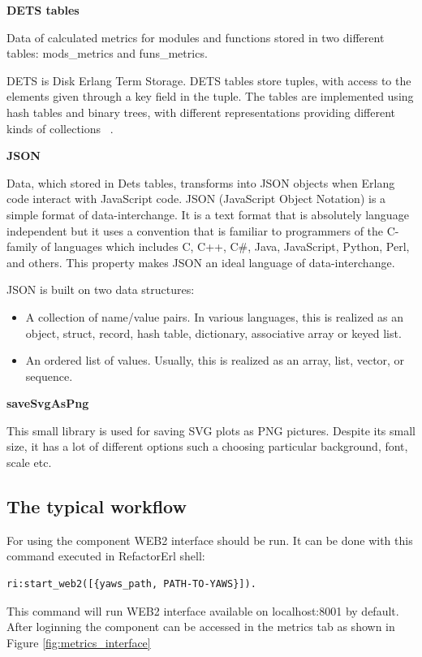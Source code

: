 \textbf{DETS tables}

Data of calculated metrics for modules and functions stored in two different tables: mods\_metrics and funs\_metrics.

DETS is Disk Erlang Term Storage. DETS tables store tuples, with access to the elements given through a  key field in the tuple. The tables are implemented using hash tables and binary trees, with different representations providing different kinds of collections ~\cite{erland_o'reilly}.

\textbf{JSON}

Data, which stored in Dets tables, transforms into JSON objects when Erlang code interact with JavaScript code. JSON (JavaScript Object Notation) is a simple format of data-interchange. It is a text format that is absolutely language independent but it uses a convention that is familiar to programmers of the C-family of languages which includes C, C++, C\#, Java, JavaScript, Python, Perl, and others. This property makes JSON an ideal language of data-interchange.

JSON is built on two data structures:
\begin{itemize}
	\item A collection of name/value pairs. In various languages, this is realized as an object, struct, record, hash table, dictionary, associative array or keyed list.
	\item An ordered list of values. Usually, this is realized as an array, list, vector, or sequence.
\end{itemize}

\textbf{saveSvgAsPng}

This small library is used for saving SVG plots as PNG pictures. Despite its small size, it has a lot of different options such a choosing particular background, font, scale etc. 

\subsection{The typical workflow}

For using the component WEB2 interface should be run. It can be done with this command executed in RefactorErl shell:

\begin{lstlisting}[frame=none, numbers=none]
	ri:start_web2([{yaws_path, PATH-TO-YAWS}]).
\end{lstlisting}

This command will run WEB2 interface available on localhost:8001 by default. After loginning the component can be accessed in the metrics tab as shown in Figure \ref{fig:metrics_interface}

